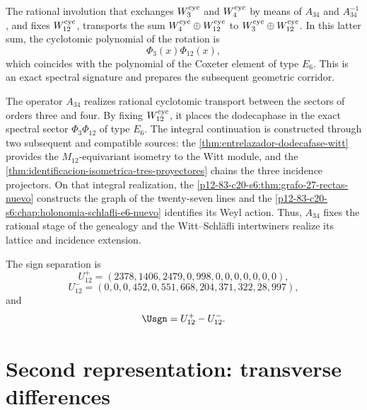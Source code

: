 The rational involution that exchanges \(W_3^{\rm cyc}\) and
\(W_4^{\rm cyc}\) by means of \(A_{34}\) and \(A_{34}^{-1}\), and fixes
\(W_{12}^{\rm cyc}\), transports the sum
\(W_4^{\rm cyc}\oplus W_{12}^{\rm cyc}\) to
\(W_3^{\rm cyc}\oplus W_{12}^{\rm cyc}\). In this latter sum, the cyclotomic
polynomial of the rotation is
\[
 \Phi_3(x)\Phi_{12}(x),
\]
which coincides with the polynomial of the Coxeter element of type \(E_6\). This is an exact
spectral signature and prepares the subsequent geometric corridor.

\begin{statusbox}[title={Rational transport and integral continuation}]
The operator \(A_{34}\) realizes rational cyclotomic transport between the
sectors of orders three and four. By fixing \(W_{12}^{\rm cyc}\), it places the
dodecaphase in the exact spectral sector
\(\Phi_3\Phi_{12}\) of type \(E_6\). The integral continuation is constructed
through two subsequent and compatible sources: the
\cref{thm:entrelazador-dodecafase-witt} provides the
\(M_{12}\)-equivariant isometry to the Witt module, and the
\cref{thm:identificacion-isometrica-tres-proyectores} chains the three
incidence projectors. On that integral realization, the
\cref{p12-83-c20-s6:thm:grafo-27-rectas-nuevo} constructs the graph of the
twenty-seven lines and the
\cref{p12-83-c20-s6:chap:holonomia-schlafli-e6-nuevo} identifies its Weyl
action. Thus, \(A_{34}\) fixes the rational stage of the genealogy and the
Witt--Schläfli intertwiners realize its lattice and
incidence extension.
\end{statusbox}

The sign separation is
\[
U_{12}^{+}
=(2378,1406,2479,0,998,0,0,0,0,0,0,0),
\]
\[
U_{12}^{-}
=(0,0,0,452,0,551,668,204,371,322,28,997),
\]
and
\[
\Usgn=U_{12}^{+}-U_{12}^{-}.
\]

\section{Second representation: transverse differences}

